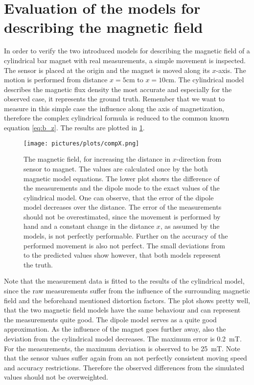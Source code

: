 \section{Evaluation of the models for describing the magnetic field} \label{sec:modelDif}

In order to verify the two introduced models for describing the magnetic field of a cylindrical bar magnet with real measurements, a simple movement is inspected. The sensor is placed at the origin and the magnet is moved along its $ x $-axis. The motion is performed from distance $ x=5\si{\cm} $ to $ x=10\si{\cm} $. The cylindrical model describes the magnetic flux density the most accurate and especially for the observed case, it represents the ground truth. Remember that we want to measure in this simple case the influence along the axis of magnetization, therefore the complex cylindrical formula is reduced to the common known equation \ref{eq:b_z}. The results are plotted in \ref{fig:modCompFlat}.
\begin{figure}[h]
\centering
\texttt{[image: pictures/plots/compX.png]}
\caption[Comparing the models and sensor measurements for flat movement]
{The magnetic field, for increasing the distance in $ x $-direction from sensor to magnet. The values are calculated once by the both magnetic model equations. The lower plot shows the difference of the measurements and the dipole mode to the exact values of the cylindrical model. One can observe, that the error of the dipole model decreases over the distance. The error of the measurements should not be overestimated, since the movement is performed by hand and a constant change in the distance $ x $, as assumed by the models, is not perfectly performable. Further on the accuracy of the performed movement is also not perfect. The small deviations from to the predicted values show however, that both models represent the truth.}
\label{fig:modCompFlat}
\end{figure}
Note that the measurement data is fitted to the results of the cylindrical model, since the raw measurements suffer from the influence of the surrounding magnetic field and the beforehand mentioned distortion factors. The plot shows pretty well, that the two magnetic field models have the same behaviour and can represent the measurements quite good. The dipole model serves as a quite good approximation. As the influence of the magnet goes further away, also the deviation from the cylindrical model decreases. The maximum error is \SI{0.2}{\milli \tesla}. For the measurements, the maximum deviation is observed to be \SI{25}{\milli \tesla}. Note that the sensor values suffer again from an not perfectly consistent moving speed and accuracy restrictions. Therefore the observed differences from the simulated values should not be overweighted.

